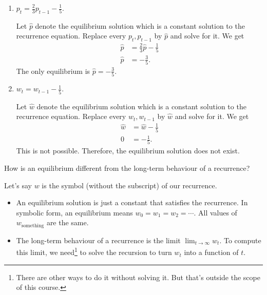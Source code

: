 \documentclass[../main.tex]{subfiles}
\begin{document}
\begin{exercise}
\begin{enumerate}
    \item \(p_{t} = \frac{2}{3}p_{t-1} - \frac{1}{5}\).

      \begin{solution}
        Let \(\hat{p}\) denote the equilibrium solution which is a constant solution to the recurrence equation.  Replace every \(p_{t}, p_{t-1}\) by \(\hat{p}\) and solve for it.  We get
        \begin{align*}
          \hat{p} &= \frac{2}{3}\hat{p} - \frac{1}{5} \\
          \hat{p} &= -\frac{3}{5}.
        \end{align*}
        The only equilibrium is \(\hat{p} = -\frac{3}{5}\).
      \end{solution}

    \item \(w_{t} = w_{t-1} - \frac{1}{5}\).
      \begin{solution}
        Let \(\hat{w}\) denote the equilibrium solution which is a constant solution to the recurrence equation.  Replace every \(w_{t}, w_{t-1}\) by \(\hat{w}\) and solve for it.  We get
        \begin{align*}
          \hat{w} &= \hat{w} - \frac{1}{5} \\
          0 &= -\frac{1}{5}.
        \end{align*}
        This is not possible. Therefore, the equilibrium solution does not exist.
      \end{solution}
  \end{enumerate}

\end{exercise}

\begin{exercise}
  How is an equilibrium different from the long-term behaviour of a recurrence?

  \begin{solution}
    Let's say \(w\) is the symbol (without the subscript) of our recurrence.

    \begin{itemize}
      \item An equilibrium solution is just a constant that satisfies the recurrence. In symbolic form, an equilibrium means \(w_{0} = w_{1} = w_{2} = \cdots\). All values of \(w_{\text{something}}\) are the same.
      \item The long-term behaviour of a recurrence is the limit \(\lim_{t \to \infty} w_{t}\). To compute this limit, we need\footnote{There are other ways to do it without solving it. But that's outside the scope of this course.} to solve the recursion to turn \(w_{t}\) into a function of \(t\).
    \end{itemize}
  \end{solution}
\end{exercise}
\end{document}
